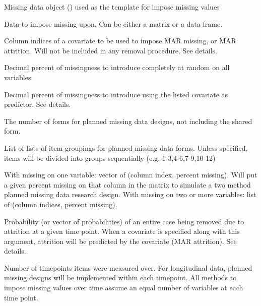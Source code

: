\documentclass[a4paper]{book}
\begin{document}
%
\begin{Arguments}
\begin{ldescription}
\item[\code{miss}] 
Missing data object () used as the template for impose missing values

\item[\code{data.mat}] 
Data to impose missing upon. Can be either a matrix or a data frame. 

\item[\code{cov}] 
Column indices of a covariate to be used to impose MAR missing, or
MAR attrition. Will not be included in any removal procedure. See details.

\item[\code{pmMCAR}] 
Decimal percent of missingness to introduce completely at random on all variables.

\item[\code{pmMAR}] 
Decimal percent of missingness to introduce using the listed
covariate as predictor. See details.

\item[\code{nforms}] 
The number of forms for planned missing data designs, not including
the shared form.

\item[\code{itemGroups}] 
List of lists of item groupings for planned missing data
forms. Unless specified, items will be divided into groups sequentially (e.g. 1-3,4-6,7-9,10-12)

\item[\code{twoMethod}] 
With missing on one variable: vector of (column index, percent missing). Will put a given percent
missing on that column in the matrix to simulate a two method
planned missing data research design. With missing on two or more variables: list of (column indices, percent missing).

\item[\code{prAttr}] 
Probability (or vector of probabilities) of an entire case being removed due to attrition at a
given time point. When a covariate is specified along with this argument, attrition
will be predicted by the covariate (MAR attrition). See details.

\item[\code{timePoints}] 
Number of timepoints items were measured over. For longitudinal
data, planned missing designs will be implemented within each
timepoint. All methods to impose missing values over time assume an equal number of
variables at each time point.


\end{ldescription}
\end{Arguments}
\end{document}
